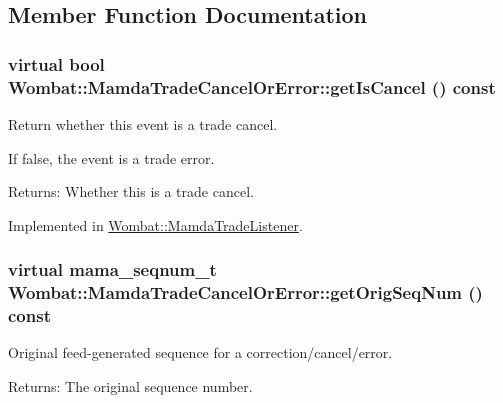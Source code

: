 \subsection{Member Function Documentation}
\hypertarget{classWombat_1_1MamdaTradeCancelOrError_2dc051dab18a59a13febfe4edcaa34ae}{
\subsubsection[getIsCancel]{\setlength{\rightskip}{0pt plus 5cm}virtual bool Wombat::Mamda\-Trade\-Cancel\-Or\-Error::get\-Is\-Cancel () const}}
\label{classWombat_1_1MamdaTradeCancelOrError_2dc051dab18a59a13febfe4edcaa34ae}


Return whether this event is a trade cancel. 

If false, the event is a trade error.

\begin{Desc}
\item[Returns:]Whether this is a trade cancel. \end{Desc}


Implemented in \hyperlink{classWombat_1_1MamdaTradeListener_d27b9e42599cbf198fbaf59df252a708}{Wombat::Mamda\-Trade\-Listener}.\hypertarget{classWombat_1_1MamdaTradeCancelOrError_b60912ebb0e47bea0b5a0f0560f9fcfa}{
\subsubsection[getOrigSeqNum]{\setlength{\rightskip}{0pt plus 5cm}virtual mama\_\-seqnum\_\-t Wombat::Mamda\-Trade\-Cancel\-Or\-Error::get\-Orig\-Seq\-Num () const}}
\label{classWombat_1_1MamdaTradeCancelOrError_b60912ebb0e47bea0b5a0f0560f9fcfa}


Original feed-generated sequence for a correction/cancel/error. 

\begin{Desc}
\item[Returns:]The original sequence number. \end{Desc}


